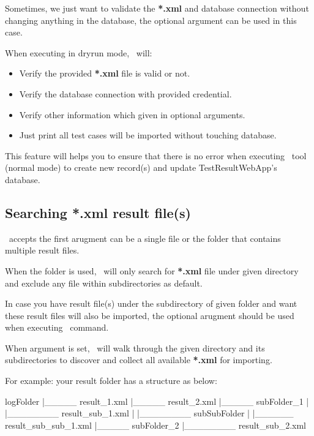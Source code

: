 Sometimes, we just want to validate the \textbf{*.xml} and database
connection without changing anything in the database, the optional
argument  can be used in this case.

When executing in dryrun mode, \pkg\ will:

\begin{itemize}
\tightlist
\item
  Verify the provided \textbf{*.xml} file is valid or not.
\item
  Verify the database connection with provided credential.
\item
  Verify other information which given in optional arguments.
\item
  Just print all test cases will be imported without touching database.
\end{itemize}

This feature will helps you to ensure that there is no error when
executing \pkg\ tool (normal mode) to create new record(s) and
update TestResultWebApp's database.

\hypertarget{searching-.xml-result-files}{%
\subsection{Searching *.xml result file(s)}}\label{searching-.xml-result-files}

\pkg\ accepts the first arugment  can be a
single file or the folder that contains multiple result files.

When the folder is used, \pkg\ will only search for
\textbf{*.xml} file under given directory and exclude any file within
subdirectories as default.

In case you have result file(s) under the subdirectory of given folder
and want these result files will also be imported, the optional arugment
 should be used when executing \pkg\ command.

When  argument is set, \pkg\ will walk
through the given directory and its subdirectories to discover and
collect all available \textbf{*.xml} for importing.

For example: your result folder has a structure as below:

\begin{robotlog}
logFolder
   |_____ result_1.xml
   |_____ result_2.xml
   |_____ subFolder_1
   |         |________ result_sub_1.xml
   |         |________ subSubFolder
   |                       |______ result_sub_sub_1.xml
   |_____ subFolder_2
             |________ result_sub_2.xml
\end{robotlog}

